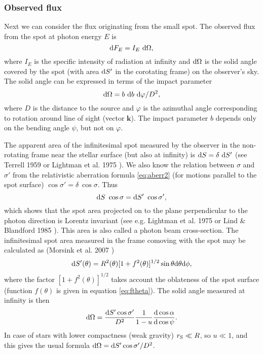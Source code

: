 \documentclass{wihuri}
\def\rg{r_{\rm S}} %
\def\be{\begin{equation}}
\def\ee{\end{equation}}
\def\d{{\rm d}}
\def\rg{r_{\rm S}} %
\def\Dop{\delta}
\newcommand{\bmath}[1]{\boldsymbol{#1}}
\begin{document}
\subsubsection{Observed flux}

Next we can consider the flux originating from the small spot. The observed flux from the spot at photon energy $E$ is
\be
\label{eq:dF_E2}
  \d F_E=I_E\ \d\Omega,
\ee
where $I_E$ is the specific intensity of radiation at infinity and $\d\Omega$ is
the solid angle covered by the spot (with area $\d S'$ in the corotating frame) on the observer's sky.
The solid angle can be expressed in terms of the impact parameter
\be
\d\Omega=b\ \d b\ \d\varphi/D^2,
\ee
where $D$ is the distance to the source and $\varphi$ is the azimuthal
angle corresponding to rotation around line of sight (vector $\bmath{k}$).
The impact parameter $b$ depends only on the bending angle $\psi$, but not on $\varphi$.


The apparent area of the infinitesimal spot measured by the observer in the non-rotating frame near the stellar surface (but also at infinity) is $\d S=\Dop\ \d S'$
(see Terrell 1959 \cite{terrell} or Lightman et al. 1975 \cite{lightman75}). %
We also know the relation between $\sigma$ and $\sigma'$ from the relativistic aberration formula \ref{eq:aberr2} (for motions parallel to the spot surface) $\cos\sigma' =   \Dop \ \cos\sigma$. Thus 
\be \label{eq:Salpha2}
\d S\ \cos\sigma = \d S'\ \cos\sigma', 
\ee
which shows that the spot area projected on to the plane perpendicular to the photon direction is Lorentz invariant (see e.g.  Lightman et al. 1975 \cite{lightman75} or 
Lind \& Blandford 1985 \cite{lindbland85}). This area is also called a photon beam cross-section.
The infinitesimal spot area measured in the frame comoving with the spot may be calculated as (Morsink et al. 2007 \cite{morsink})
\be \label{eq:surf_element}
\d S'(\theta) = R^{2}(\theta) [1+f^{2}(\theta)]^{1/2} \sin \theta \d \theta \d \phi,
\ee
where the factor $[1+f^{2}(\theta)]^{1/2}$ takes account the oblateness of the spot surface (function $f(\theta)$ is given in equation \ref{eq:ftheta}).
The solid angle measured at infinity is then \cite{morsink}
\be\label{eq:omega2}
 \d\Omega=\frac{\d S' \cos \sigma'}{D^2} \frac{1}{1-u} \frac{\d\cos\alpha}{\d\cos\psi}.
\ee
In case of stars with lower compactness (weak gravity) $\rg \ll R$, so $u\ll 1$, and this gives
the usual formula $\d\Omega=\d S' \cos \sigma'/D^2$. 
\end{document}
